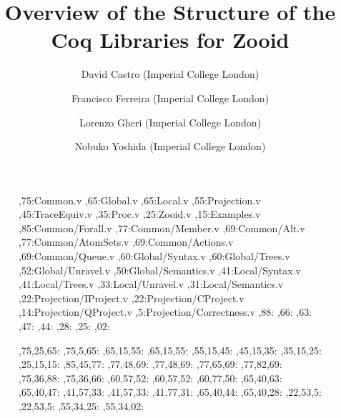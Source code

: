 \documentclass[11pt, a4paper,UKenglish,cleveref, autoref, thm-restate]{article}
\title{\bf Overview of the Structure of the Coq Libraries for Zooid}
\author{David Castro (Imperial College London) \and Francisco Ferreira (Imperial College London) \and Lorenzo Gheri (Imperial College London)\and Nobuko Yoshida (Imperial College London)}
\begin{document}
\maketitle

\setcounter{diagheight}{90}


\begin{figure}
\begin{chart}%

,75:{}{Common.v}{}
,65:{}{Global.v}{}
,65:{}{Local.v}{}
,55:{}{Projection.v}{}
,45:{}{TraceEquiv.v}{}
,35:{}{Proc.v}{}
,25:{}{Zooid.v}{}
,15:{}{Examples.v}{}
,85:{}{Common/Forall.v}{}
,77:{}{Common/Member.v}{}
,69:{}{Common/Alt.v}{}
,77:{}{Common/AtomSets.v}{}
,69:{}{Common/Actions.v}{}
,69:{}{Common/Queue.v}{}
,60:{}{Global/Syntax.v}{}
,60:{}{Global/Trees.v}{}
,52:{}{Global/Unravel.v}{}
,50:{}{Global/Semantics.v}{}
,41:{}{Local/Syntax.v}{}
,41:{}{Local/Trees.v}{}
,33:{}{Local/Unravel.v}{}
,31:{}{Local/Semantics.v}{}
,22:{}{Projection/IProject.v}{}
,22:{}{Projection/CProject.v}{}
,14:{}{Projection/QProject.v}{}
,5:{}{Projection/Correctness.v}{}
,88:{}
,66:{}
,63:{}
,47:{}
,44:{}
,28:{}
,25:{}
,02:{}

,75,25,65:
,75,5,65:
,65,15,55:
,65,15,55:
,55,15,45:
,45,15,35:
,35,15,25:
,25,15,15:
,85,45,77:
,77,48,69:
,77,48,69:
,77,65,69:
,77,82,69:
,75,36,88:
,75,36,66:
,60,57,52:
,60,57,52:
,60,77,50:
,65,40,63:
,65,40,47:
,41,57,33:
,41,57,33:
,41,77,31:
,65,40,44:
,65,40,28:
,22,53,5:
,22,53,5:
,55,34,25:
,55,34,02:


\end{chart}
\end{figure}
\end{document}
